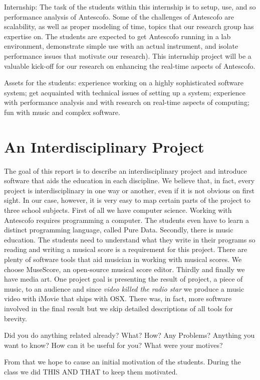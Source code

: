\documentclass[onecolumn,nocopyrightspace,preprint]{sigplanconf}
\begin{document}
Internship: The task of the students within this internship is to setup, use,
and so performance analysis of Antescofo. Some of the challenges of Antescofo
are scalability, as well as proper modeling of time, topics that our
research group has expertise on. The students are expected to get Antescofo
running in a lab environment, demonstrate simple use with an actual
instrument, and isolate performance issues that motivate our research). This
internship project will be a valuable kick-off for our research on enhancing
the real-time aspects of Antescofo.

Assets for the students: experience working on a highly
sophisticated software system; get acquainted with technical issues of
setting up a system; experience with performance analysis and with research
on real-time aspects of computing; fun with music and complex software.


\section{An Interdisciplinary Project}

The goal of this report is to describe an interdisciplinary project and
introduce software that aids the education in each discipline.  We believe
that, in fact, every project is interdisciplinary in one way or another, even
if it is not obvious on first sight. In our case, however, it is very easy to
map certain parts of the project to three school subjects. First of all we
have computer science. Working with Antescofo requires programming a computer.
The students even have to learn a distinct programming language, called Pure
Data. Secondly, there is music education. The students need to understand what
they write in their programs so reading and writing a musical score is a
requirement for this project. There are plenty of software tools that aid
musician in working with musical scores. We choose MuseScore, an open-source
musical score editor. Thirdly and finally we have media art. One project goal
is presenting the result of project, a piece of music, to an audience and
since \textit{video killed the radio star} we produce a music video with
iMovie that ships with OSX. There was, in fact, more software involved in the
final result but we skip detailed descriptions of all tools for brevity.


Did you do anything related already? What? How? Any Problems? Anything you want to know?
How can it be useful for you?
What were your motives?

From that we hope to cause an initial motivation of the students. During the class we did THIS AND THAT
to keep them motivated.
\end{document}
